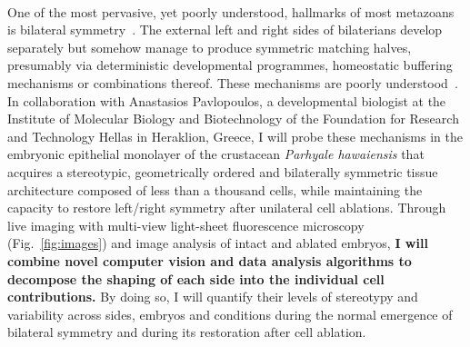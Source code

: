 \paragraph{}One of the most pervasive, yet poorly understood, hallmarks of most metazoans is bilateral symmetry~\cite{Genikhovich2017}.
The external left and right sides of bilaterians develop separately but somehow manage to produce symmetric matching halves, presumably via deterministic developmental programmes, homeostatic buffering mechanisms or combinations thereof.
These mechanisms are poorly understood~\cite{Wolpert2010,Grimes2019}.
In collaboration with Anastasios Pavlopoulos, a developmental biologist at the Institute of Molecular Biology and Biotechnology of the Foundation for Research and Technology Hellas in Heraklion, Greece, I will probe these mechanisms in the embryonic epithelial monolayer of the crustacean \textit{Parhyale hawaiensis} that acquires a stereotypic, geometrically ordered and bilaterally symmetric tissue architecture composed of less than a thousand cells, while maintaining the capacity to restore left/right symmetry after unilateral cell ablations.
Through live imaging with multi-view light-sheet fluorescence microscopy~\cite{Wolff:2018aa} (Fig.~\ref{fig:images}) and image analysis of intact and ablated embryos, \textbf{I will combine novel computer vision and data analysis algorithms to decompose the shaping of each side into the individual cell contributions.} {By doing so, I will quantify their levels of stereotypy and variability across sides, embryos and conditions during the normal emergence of bilateral symmetry and during its restoration after cell ablation}.
